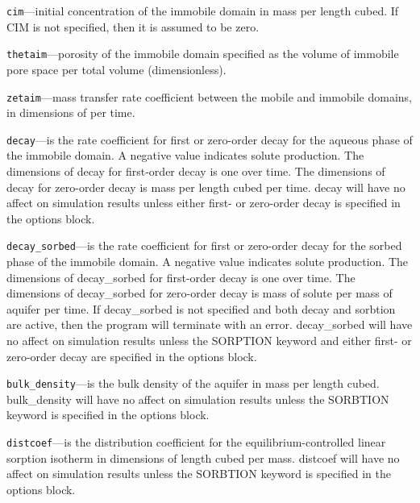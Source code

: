 \begin{description}
\item \texttt{cim}---initial concentration of the immobile domain in mass per length cubed.  If CIM is not specified, then it is assumed to be zero.

\item \texttt{thetaim}---porosity of the immobile domain specified as the volume of immobile pore space per total volume (dimensionless).

\item \texttt{zetaim}---mass transfer rate coefficient between the mobile and immobile domains, in dimensions of per time.

\item \texttt{decay}---is the rate coefficient for first or zero-order decay for the aqueous phase of the immobile domain.  A negative value indicates solute production.  The dimensions of decay for first-order decay is one over time.  The dimensions of decay for zero-order decay is mass per length cubed per time.  decay will have no affect on simulation results unless either first- or zero-order decay is specified in the options block.

\item \texttt{decay\_sorbed}---is the rate coefficient for first or zero-order decay for the sorbed phase of the immobile domain.  A negative value indicates solute production.  The dimensions of decay\_sorbed for first-order decay is one over time.  The dimensions of decay\_sorbed for zero-order decay is mass of solute per mass of aquifer per time.  If decay\_sorbed is not specified and both decay and sorbtion are active, then the program will terminate with an error.  decay\_sorbed will have no affect on simulation results unless the SORPTION keyword and either first- or zero-order decay are specified in the options block.

\item \texttt{bulk\_density}---is the bulk density of the aquifer in mass per length cubed.  bulk\_density will have no affect on simulation results unless the SORBTION keyword is specified in the options block.

\item \texttt{distcoef}---is the distribution coefficient for the equilibrium-controlled linear sorption isotherm in dimensions of length cubed per mass.  distcoef will have no affect on simulation results unless the SORBTION keyword is specified in the options block.

\end{description}

